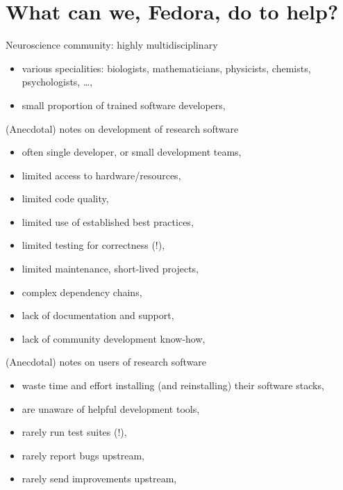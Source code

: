 \section{What can we, Fedora, do to help?}
\begin{frame}[c]{Neuroscience community: highly multidisciplinary}
  \begin{itemize}
    \item \alert{various specialities:} biologists, mathematicians, physicists, chemists, psychologists, \ldots, 
      \pause{}
    \item \alert{small proportion of trained software developers},
  \end{itemize}
\end{frame}
\begin{frame}[c]{(Anecdotal) notes on development of research software}
  \begin{itemize}
    \item often \alert{single developer}, or small development teams,
      \pause{}
    \item limited \alert{access to hardware/resources},
      \pause{}
    \item limited \alert{code quality},
      \pause{}
    \item limited \alert{use of established best practices},
      \pause{}
    \item limited \alert{testing for correctness (!)},
      \pause{}
    \item limited \alert{maintenance, short-lived projects},
      \pause{}
    \item \alert{complex dependency chains},
      \pause{}
    \item lack of \alert{documentation and support},
      \pause{}
    \item lack of \alert{community development know-how},
  \end{itemize}
\end{frame}
\begin{frame}[c]{(Anecdotal) notes on users of research software}
  \begin{itemize}
    \item \alert{waste time and effort} installing (and reinstalling) their software stacks,
      \pause{}
    \item are \alert{unaware of helpful development tools},
      \pause{}
    \item \alert{rarely run test suites (!)},
      \pause{}
    \item \alert{rarely report bugs} upstream,
      \pause{}
    \item \alert{rarely send improvements} upstream,
  \end{itemize}
\end{frame}
